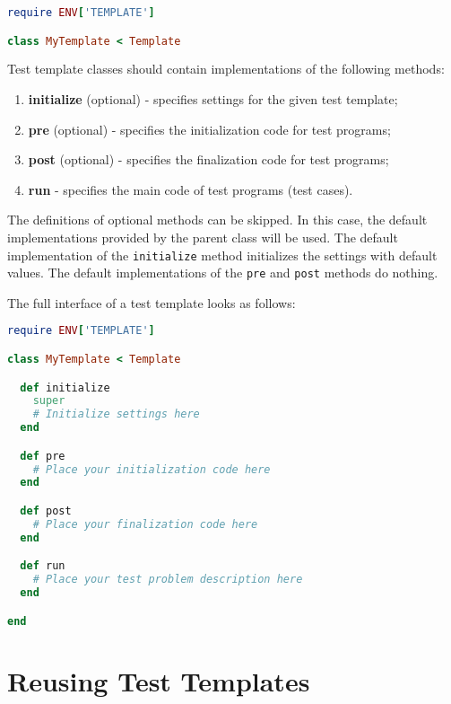 \documentclass[oneside,final,12pt]{extreport}
\begin{document}
\begin{lstlisting}[language=ruby]
require ENV['TEMPLATE']

class MyTemplate < Template
\end{lstlisting}

Test template classes should contain implementations of the following methods:

\begin{enumerate}
  \item \textbf{initialize} (optional) - specifies settings for the given test template;
  \item \textbf{pre} (optional) - specifies the initialization code for test programs;
  \item \textbf{post} (optional) - specifies the finalization code for test programs;
  \item \textbf{run} - specifies the main code of test programs (test cases).
\end{enumerate}

The definitions of optional methods can be skipped. In this case, the default
implementations provided by the parent class will be used. The default implementation
of the \texttt{initialize} method initializes the settings with default values. The default
implementations of the \texttt{pre} and \texttt{post} methods do nothing.

The full interface of a test template looks as follows:

\begin{lstlisting}[language=ruby]
require ENV['TEMPLATE']

class MyTemplate < Template

  def initialize
    super
    # Initialize settings here 
  end

  def pre
    # Place your initialization code here
  end

  def post
    # Place your finalization code here
  end

  def run
    # Place your test problem description here
  end

end
\end{lstlisting}


\section{Reusing Test Templates}
\end{document}
